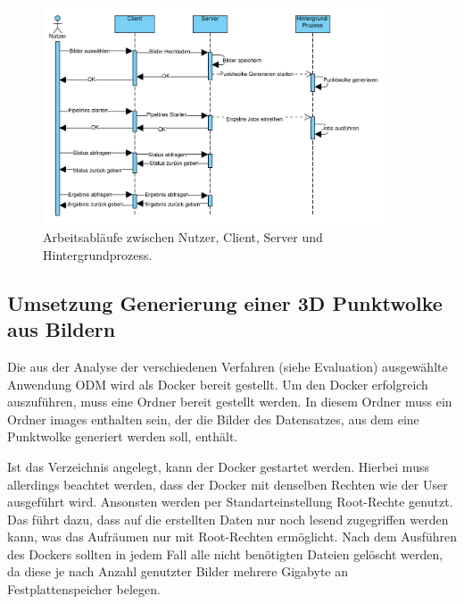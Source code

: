 \documentclass[12pt,titlepage, twoside]{article}
\begin{document}
\begin{figure}
    \centering
    \includegraphics[width=0.9\textwidth]{./Images/WorkflowClientServer.png}
    \caption{Arbeitsabläufe zwischen Nutzer, Client, Server und Hintergrundprozess.}
    \label{fig:WorkflowClientServer}
\end{figure}

\subsection{Umsetzung Generierung einer 3D Punktwolke aus Bildern}
\label{sec:realisierung:implementierung1}

Die aus der Analyse der verschiedenen Verfahren (siehe Evaluation) ausgewählte Anwendung ODM wird als Docker bereit gestellt. Um den Docker erfolgreich auszuführen, muss eine Ordner bereit gestellt werden.
In diesem Ordner muss ein Ordner \glqq images\grqq{} enthalten sein, der die Bilder des Datensatzes, aus dem eine Punktwolke generiert werden soll, enthält.

Ist das Verzeichnis angelegt, kann der Docker gestartet werden. Hierbei muss allerdings beachtet werden, dass der Docker mit denselben Rechten wie der User ausgeführt wird. 
Ansonsten werden per Standarteinstellung Root-Rechte genutzt.
Das führt dazu, dass auf die erstellten Daten nur noch lesend zugegriffen werden kann, was das Aufräumen nur mit Root-Rechten ermöglicht.
Nach dem Ausführen des Dockers sollten in jedem Fall alle nicht benötigten Dateien gelöscht werden, da diese je nach Anzahl genutzter Bilder mehrere Gigabyte an Festplattenspeicher belegen.
\end{document}
